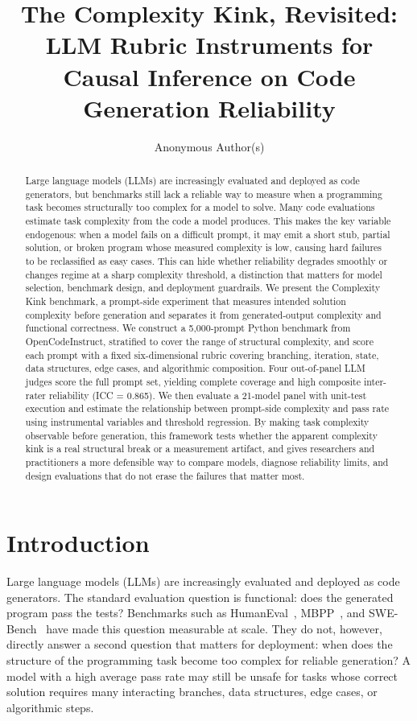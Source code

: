 \documentclass{article}
\title{The Complexity Kink, Revisited: LLM Rubric Instruments for Causal Inference on Code Generation Reliability}
\author{%
  Anonymous Author(s)
}
\begin{document}
\maketitle

\begin{abstract}
Large language models (LLMs) are increasingly evaluated and deployed as code generators, but benchmarks still lack a reliable way to measure when a programming task becomes structurally too complex for a model to solve. Many code evaluations estimate task complexity from the code a model produces. This makes the key variable endogenous: when a model fails on a difficult prompt, it may emit a short stub, partial solution, or broken program whose measured complexity is low, causing hard failures to be reclassified as easy cases. This can hide whether reliability degrades smoothly or changes regime at a sharp complexity threshold, a distinction that matters for model selection, benchmark design, and deployment guardrails. We present the Complexity Kink benchmark, a prompt-side experiment that measures intended solution complexity before generation and separates it from generated-output complexity and functional correctness. We construct a 5,000-prompt Python benchmark from OpenCodeInstruct, stratified to cover the range of structural complexity, and score each prompt with a fixed six-dimensional rubric covering branching, iteration, state, data structures, edge cases, and algorithmic composition. Four out-of-panel LLM judges score the full prompt set, yielding complete coverage and high composite inter-rater reliability (ICC = 0.865). We then evaluate a 21-model panel with unit-test execution and estimate the relationship between prompt-side complexity and pass rate using instrumental variables and threshold regression. By making task complexity observable before generation, this framework tests whether the apparent complexity kink is a real structural break or a measurement artifact, and gives researchers and practitioners a more defensible way to compare models, diagnose reliability limits, and design evaluations that do not erase the failures that matter most.
\end{abstract}

\section{Introduction}

Large language models (LLMs) are increasingly evaluated and deployed as code generators. The standard evaluation question is functional: does the generated program pass the tests? Benchmarks such as HumanEval~\cite{chen2021evaluating}, MBPP~\cite{austin2021program}, and SWE-Bench~\cite{jimenez2023swebench} have made this question measurable at scale. They do not, however, directly answer a second question that matters for deployment: when does the structure of the programming task become too complex for reliable generation? A model with a high average pass rate may still be unsafe for tasks whose correct solution requires many interacting branches, data structures, edge cases, or algorithmic steps.
\end{document}
